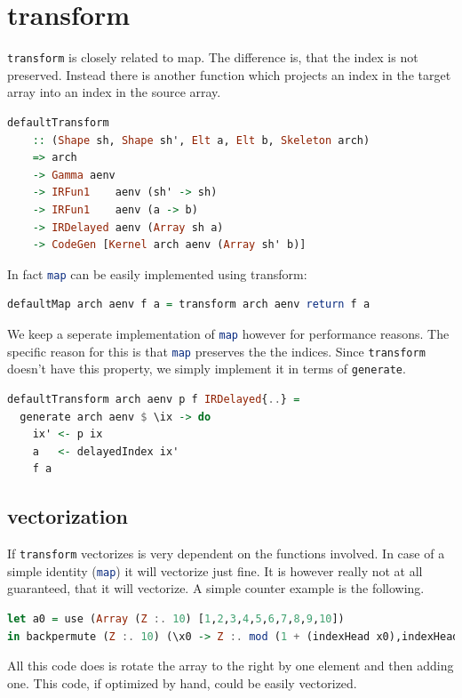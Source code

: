 \documentclass[a4paper,bibliography=totocnumbered,parskip,headsepline]{scrbook}
\begin{document}
\section{transform}
\lstinline[language=haskell]!transform! is closely related to map.
The difference is, that the index is not preserved.
Instead there is another function which projects an index in the target array into an index in the source array.
\begin{lstlisting}[language=haskell]
defaultTransform
    :: (Shape sh, Shape sh', Elt a, Elt b, Skeleton arch)
    => arch
    -> Gamma aenv
    -> IRFun1    aenv (sh' -> sh)
    -> IRFun1    aenv (a -> b)
    -> IRDelayed aenv (Array sh a)
    -> CodeGen [Kernel arch aenv (Array sh' b)]
\end{lstlisting}
In fact \lstinline[language=haskell]!map! can be easily implemented using transform:
\begin{lstlisting}[language=haskell]
defaultMap arch aenv f a = transform arch aenv return f a
\end{lstlisting}
We keep a seperate implementation of \lstinline[language=haskell]!map! however for performance reasons.
The specific reason for this is that \lstinline[language=haskell]!map! preserves the the indices.
Since \lstinline[language=haskell]!transform! doesn't have this property, we simply implement it in terms of \lstinline[language=haskell]!generate!.
\begin{lstlisting}[language=haskell]
defaultTransform arch aenv p f IRDelayed{..} =
  generate arch aenv $ \ix -> do
    ix' <- p ix
    a   <- delayedIndex ix'
    f a
\end{lstlisting}

\subsection{vectorization}
If \lstinline[language=haskell]!transform! vectorizes is very dependent on the functions involved.
In case of a simple identity (\lstinline[language=haskell]!map!) it will vectorize just fine.
It is however really not at all guaranteed, that it will vectorize.
A simple counter example is the following.
\begin{lstlisting}[language=haskell]
let a0 = use (Array (Z :. 10) [1,2,3,4,5,6,7,8,9,10])
in backpermute (Z :. 10) (\x0 -> Z :. mod (1 + (indexHead x0),indexHead (shape a0))) a0
\end{lstlisting}
All this code does is rotate the array to the right by one element and then adding one.
This code, if optimized by hand, could be easily vectorized.
\end{document}
